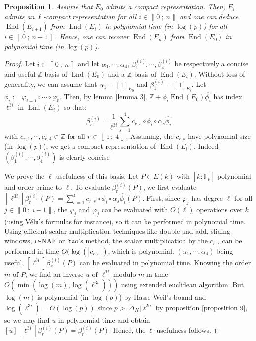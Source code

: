 \documentclass[a4paper,10pt]{report}
\theoremstyle{definition}
\theoremstyle{plain}
\newtheorem{proposition}[definition]{Proposition}
\theoremstyle{definition}
\newcommand{\Z}{\mathbb{Z}}
\newcommand{\F}{\mathbb{F}}
\renewcommand{\i}[2]{\left\llbracket #1~;~#2\right\rrbracket}
\renewcommand{\(}{\left(}
\renewcommand{\)}{\right)}
\DeclareMathOperator{\End}{End}
\begin{document}
\begin{proposition}
Assume that $E_0$ admits a compact representation.  Then, $E_i$ admits an $\ell$-compact representation for all $i\in\i{0}{n}$ and one can deduce $\End(E_{i+1})$ from $\End(E_i)$ in polynomial time (in $\log(p)$) for all $i\in\i{0}{n-1}$. Hence, one can recover $\End(E_n)$ from $\End(E_0)$ in polynomial time (in $\log(p)$).
\end{proposition}

\begin{proof}
Let $i\in\i{0}{n}$ and let $\alpha_1,\cdots,\alpha_4$, $\beta_1^{(i)},\cdots,\beta_4^{(i)}$ be respectively a concise and useful $\Z$-basis of $\End(E_0)$ and a $\Z$-basis of $\End(E_i)$. Without loss of generality, we can assume that $\alpha_1=[1]_{E_0}$ and $\beta_1^{(i)}=[1]_{E_i}$. Let $\phi_i:=\varphi_{i-1}\circ\cdots\circ\varphi_0$. Then, by lemma \ref{lemma 3}, $\Z+\phi_i\End(E_0)\widehat{\phi_i}$ has index $\ell^{3i}$ in $\End(E_i)$ so that:
\[\beta_r^{(i)}=\frac{1}{\ell^{3i}}\sum_{s=1}^4 c_{r,s}\circ \phi_i\circ \alpha_s\widehat{\phi_i}\]
with $c_{r,1},\cdots,c_{r,4}\in\Z$ for all $r\in\i{1}{4}$.  Assuming, the $c_{r,s}$ have polynomial size (in $\log(p)$), we get a compact representation of $\End(E_i)$. Indeed,  $(\beta_1^{(i)},\cdots,\beta_4^{(i)})$ is clearly concise.  

We prove the $\ell$-usefulness of this basis. Let $P\in E(k)$ with $[k:\F_p]$ polynomial and order prime to $\ell$.  To evaluate $\beta_r^{(i)}(P)$, we first evaluate $[\ell^{3i}]\beta_r^{(i)}(P)=\sum_{s=1}^4 c_{r,s}\circ \phi_i\circ \alpha_s\widehat{\phi_i}(P)$.  First, since $\varphi_j$ has degree $\ell$ for all $j\in\i{0}{i-1}$, the $\varphi_j$ and $\widehat{\varphi_j}$ can be evaluated with $O(\ell)$ operations over $k$ (using V\'{e}lu's formulas \cite{Velu} for instance), so it can be performed in polynomial time.  Using efficient scalar multiplication techniques like double and add,  sliding windows, $w$-NAF or Yao's method, the scalar multiplication by the $c_{r,s}$ can be performed in time $O(\log(|c_{r,s}|)$, which is polynomial. $(\alpha_1,\cdots,\alpha_4)$ being useful, $[\ell^{3i}]\beta_r^{(i)}(P)$ can be evaluated in polynomial time. Knowing the order $m$ of $P$, we find an inverse $u$ of $\ell^{3i}$ modulo $m$ in time $O(\min(\log(m),\log(\ell^{3i})))$ using extended euclidean algorithm. But $\log(m)$ is polynomial (in $\log(p)$) by Hasse-Weil's bound and $\log(\ell^{3i})=O(\log(p))$ since $p>|\Delta_K|\ell^{2n}$ by proposition \ref{proposition 9}, so we may find $u$ in polynomial time and obtain $[u][\ell^{3i}]\beta_r^{(i)}(P)=\beta_r^{(i)}(P)$.  Hence, the $\ell$-usefulness follows.


\end{proof}
\end{document}
